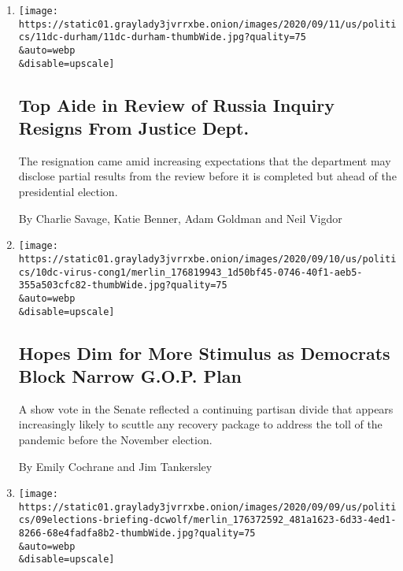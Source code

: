 \begin{enumerate}
\def\labelenumi{\arabic{enumi}.}
\item
  \href{/2020/09/11/us/politics/nora-dannehy-durham-russia-investigation.html}{}

  \texttt{[image: https://static01.graylady3jvrrxbe.onion/images/2020/09/11/us/politics/11dc-durham/11dc-durham-thumbWide.jpg?quality=75\\\&auto=webp\\\&disable=upscale]}

  \hypertarget{top-aide-in-review-of-russia-inquiry-resigns-from-justice-dept}{%
  \subsection{Top Aide in Review of Russia Inquiry Resigns From Justice
  Dept.}\label{top-aide-in-review-of-russia-inquiry-resigns-from-justice-dept}}

  The resignation came amid increasing expectations that the department
  may disclose partial results from the review before it is completed
  but ahead of the presidential election.

  By Charlie Savage, Katie Benner, Adam Goldman and Neil Vigdor
\item
  \href{/2020/09/10/us/politics/second-stimulus-check.html}{}

  \texttt{[image: https://static01.graylady3jvrrxbe.onion/images/2020/09/10/us/politics/10dc-virus-cong1/merlin\_176819943\_1d50bf45-0746-40f1-aeb5-355a503cfc82-thumbWide.jpg?quality=75\\\&auto=webp\\\&disable=upscale]}

  \hypertarget{hopes-dim-for-more-stimulus-as-democrats-block-narrow-gop-plan}{%
  \subsection{Hopes Dim for More Stimulus as Democrats Block Narrow
  G.O.P.
  Plan}\label{hopes-dim-for-more-stimulus-as-democrats-block-narrow-gop-plan}}

  A show vote in the Senate reflected a continuing partisan divide that
  appears increasingly likely to scuttle any recovery package to address
  the toll of the pandemic before the November election.

  By Emily Cochrane and Jim Tankersley
\item
  \href{/2020/09/09/us/elections/a-whistle-blower-accuses-top-homeland-security-officials-of-playing-down-threats-from-russia-and-white-supremacists.html}{}

  \texttt{[image: https://static01.graylady3jvrrxbe.onion/images/2020/09/09/us/politics/09elections-briefing-dcwolf/merlin\_176372592\_481a1623-6d33-4ed1-8266-68e4fadfa8b2-thumbWide.jpg?quality=75\\\&auto=webp\\\&disable=upscale]}


\end{enumerate}
